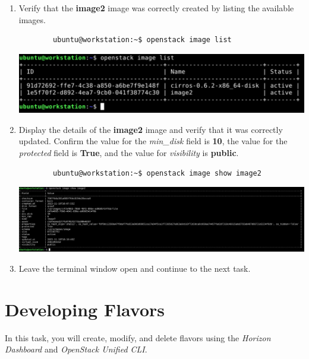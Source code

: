 \documentclass[letterpaper, 12pt]{article}
\begin{document}
\begin{enumerate}
    \item Verify that the \textbf{image2} image was correctly created by listing the available images.
    \begin{lstlisting}
        ubuntu@workstation:~$ openstack image list
    \end{lstlisting}

    \begin{center}
        \includegraphics[width=\linewidth]{images/part1/step17.png}
    \end{center}

    \item Display the details of the \textbf{image2} image and verify that it was correctly updated. Confirm the value
    for the \textit{min\_disk} field is \textbf{10}, the value for the \textit{protected} field is \textbf{True}, and
    the value for \textit{visibility} is \textbf{public}.
    \begin{lstlisting}
        ubuntu@workstation:~$ openstack image show image2
    \end{lstlisting}

    \begin{center}
        \includegraphics[width=\linewidth]{images/part1/step18.png}
    \end{center}

    \item Leave the terminal window open and continue to the next task.

\end{enumerate}

\section{Developing Flavors}
\label{sec:developing_flavors}
In this task, you will create, modify, and delete flavors using the \textit{Horizon Dashboard} and
\textit{OpenStack Unified CLI}.
\end{document}
